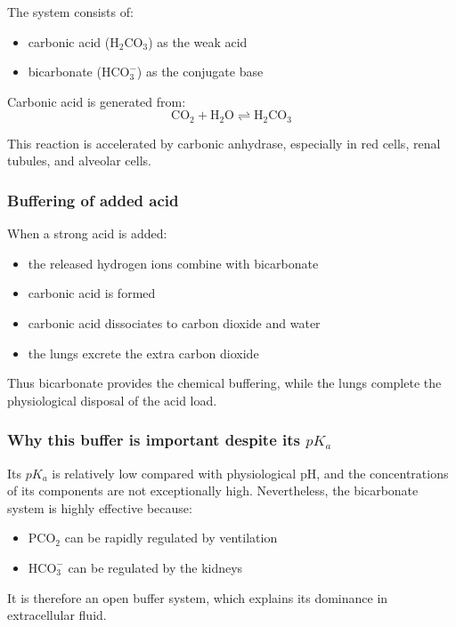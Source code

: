 \documentclass[11pt,a4paper]{article}
\begin{document}
The system consists of:

\begin{itemize}
    \item carbonic acid (\(\mathrm{H_2CO_3}\)) as the weak acid
    \item bicarbonate (\(\mathrm{HCO_3^-}\)) as the conjugate base
\end{itemize}

Carbonic acid is generated from:
\[
\mathrm{CO_2 + H_2O \rightleftharpoons H_2CO_3}
\]

This reaction is accelerated by carbonic anhydrase, especially in red cells, renal tubules, and alveolar cells.

\subsubsection{Buffering of added acid}

When a strong acid is added:

\begin{itemize}
    \item the released hydrogen ions combine with bicarbonate
    \item carbonic acid is formed
    \item carbonic acid dissociates to carbon dioxide and water
    \item the lungs excrete the extra carbon dioxide
\end{itemize}

Thus bicarbonate provides the chemical buffering, while the lungs complete the physiological disposal of the acid load.

\subsubsection{Why this buffer is important despite its \(pK_a\)}

Its \(pK_a\) is relatively low compared with physiological pH, and the concentrations of its components are not exceptionally high. Nevertheless, the bicarbonate system is highly effective because:

\begin{itemize}
    \item \( \mathrm{PCO_2} \) can be rapidly regulated by ventilation
    \item \( \mathrm{HCO_3^-} \) can be regulated by the kidneys
\end{itemize}

It is therefore an open buffer system, which explains its dominance in extracellular fluid.
\end{document}
